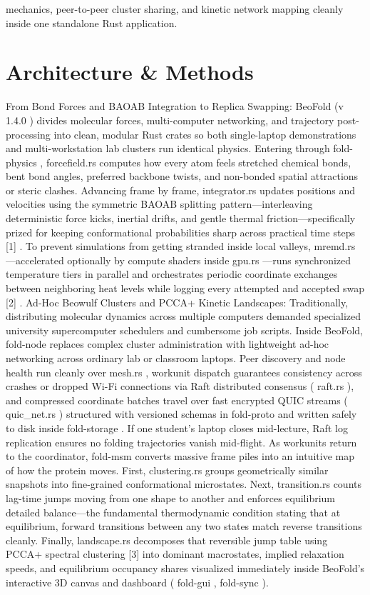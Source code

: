 \documentclass[10pt,letterpaper]{article}
\begin{document}
mechanics, peer-to-peer cluster sharing, and kinetic network mapping cleanly inside one standalone Rust application.

\section{Architecture \& Methods}
From Bond Forces and BAOAB Integration to Replica Swapping: BeoFold (v 1.4.0 ) divides molecular forces, multi-computer networking, and trajectory post-processing into clean, modular Rust crates so both single-laptop demonstrations and multi-workstation lab clusters run identical physics. Entering through fold-physics , forcefield.rs computes how every atom feels stretched chemical bonds, bent bond angles, preferred backbone twists, and non-bonded spatial attractions or steric clashes. Advancing frame by frame, integrator.rs updates positions and velocities using the symmetric BAOAB splitting pattern---interleaving deterministic force kicks, inertial drifts, and gentle thermal friction---specifically prized for keeping conformational probabilities sharp across practical time steps [1] . To prevent simulations from getting stranded inside local valleys, mremd.rs ---accelerated optionally by compute shaders inside gpu.rs ---runs synchronized temperature tiers in parallel and orchestrates periodic coordinate exchanges between neighboring heat levels while logging every attempted and accepted swap [2] . Ad-Hoc Beowulf Clusters and PCCA+ Kinetic Landscapes: Traditionally, distributing molecular dynamics across multiple computers demanded specialized university supercomputer schedulers and cumbersome job scripts. Inside BeoFold, fold-node replaces complex cluster administration with lightweight ad-hoc networking across ordinary lab or classroom laptops. Peer discovery and node health run cleanly over mesh.rs , workunit dispatch guarantees consistency across crashes or dropped Wi-Fi connections via Raft distributed consensus ( raft.rs ), and compressed coordinate batches travel over fast encrypted QUIC streams ( quic\_net.rs ) structured with versioned schemas in fold-proto and written safely to disk inside fold-storage . If one student's laptop closes mid-lecture, Raft log replication ensures no folding trajectories vanish mid-flight. As workunits return to the coordinator, fold-msm converts massive frame piles into an intuitive map of how the protein moves. First, clustering.rs groups geometrically similar snapshots into fine-grained conformational microstates. Next, transition.rs counts lag-time jumps moving from one shape to another and enforces equilibrium detailed balance---the fundamental thermodynamic condition stating that at equilibrium, forward transitions between any two states match reverse transitions cleanly. Finally, landscape.rs decomposes that reversible jump table using PCCA+ spectral clustering [3] into dominant macrostates, implied relaxation speeds, and equilibrium occupancy shares visualized immediately inside BeoFold's interactive 3D canvas and dashboard ( fold-gui , fold-sync ).
\end{document}
